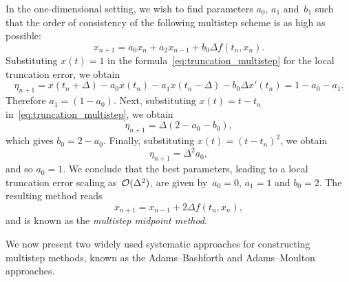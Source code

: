 \begin{example}
    In the one-dimensional setting,
    we wish to find parameters $a_0$, $a_1$ and~$b_1$ such that the order of consistency
    of the following multistep scheme is as high as possible:
     \[
         x_{n+1}  = a_0 x_n + a_2 x_{n-1} + b_0 \Delta f(t_{n}, x_{n}).
    \]
    Substituting $x(t) = 1$ in the formula~\eqref{eq:truncation_multistep} for the local truncation error,
    we obtain
    \[
        \eta_{n+1} = x(t_n + \Delta) - a_0 x(t_n) - a_1 x(t_n - \Delta) - b_0 \Delta x'(t_n)
        = 1 - a_0 - a_1.
    \]
    Therefore $a_1 = (1 - a_0)$.
    Next, substituting $x(t) = t - t_n$ in~\eqref{eq:truncation_multistep},
    we obtain
    \[
        \eta_{n+1} = \Delta (2 - a_0 - b_0),
    \]
    which gives $b_0 = 2 - a_0$.
    Finally, substituting $x(t) = (t-t_n)^2$,
    we obtain
    \[
        \eta_{n+1} = \Delta^2 a_0,
    \]
    and so $a_0 = 1$.
    We conclude that the best parameters,
    leading to a local truncation error scaling as~$\mathcal O(\Delta^2)$,
    are given by~$a_0 = 0$, $a_1 = 1$ and $b_0 = 2$.
    The resulting method reads
    \[
         x_{n+1} = x_{n-1} + 2 \Delta f(t_{n}, x_{n}),
    \]
    and is known as the \emph{multistep midpoint method}.
\end{example}
We now present two widely used systematic approaches for constructing multistep methods,
known as the Adams--Bashforth and Adams--Moulton approaches.

